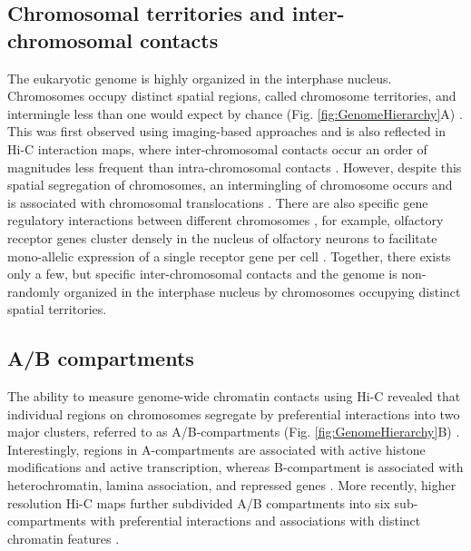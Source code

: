 \documentclass[a4paper,twoside=true,openright,parskip=full,chapterprefix=true,11pt,headings=normal,bibliography=totoc,listof=totoc,titlepage=on,captions=tableabove,draft=false]{scrreprt}
\theoremstyle{definition}
\theoremstyle{definition}
\theoremstyle{definition}
\theoremstyle{remark}
\begin{document}
\hypertarget{chromosomal-territories-and-inter-chromosomal-contacts}{%
\subsection{Chromosomal territories and inter-chromosomal
contacts}\label{chromosomal-territories-and-inter-chromosomal-contacts}}

The eukaryotic genome is highly organized in the interphase nucleus.
Chromosomes occupy distinct spatial regions, called chromosome
territories, and intermingle less than one would expect by chance (Fig.
\ref{fig:GenomeHierarchy}A) \citep{Cremer2001}. This was first observed
using imaging-based approaches and is also reflected in Hi-C interaction
maps, where inter-chromosomal contacts occur an order of magnitudes less
frequent than intra-chromosomal contacts \citep{Lieberman-Aiden2009}.
However, despite this spatial segregation of chromosomes, an
intermingling of chromosome occurs and is associated with chromosomal
translocations \citep{Branco2006, Roukos2013, Roukos2014}. There are
also specific gene regulatory interactions between different chromosomes
\citep{DeLaat2007}, for example, olfactory receptor genes cluster
densely in the nucleus of olfactory neurons to facilitate mono-allelic
expression of a single receptor gene per cell \citep{Monahan2015}.
Together, there exists only a few, but specific inter-chromosomal
contacts and the genome is non-randomly organized in the interphase
nucleus by chromosomes occupying distinct spatial territories.

\hypertarget{ab-compartments}{%
\subsection{A/B compartments}\label{ab-compartments}}

The ability to measure genome-wide chromatin contacts using Hi-C
revealed that individual regions on chromosomes segregate by
preferential interactions into two major clusters, referred to as
A/B-compartments (Fig. \ref{fig:GenomeHierarchy}B)
\citep{Lieberman-Aiden2009}. Interestingly, regions in A-compartments
are associated with active histone modifications and active
transcription, whereas B-compartment is associated with heterochromatin,
lamina association, and repressed genes \citep{Bonev2016}. More
recently, higher resolution Hi-C maps further subdivided A/B
compartments into six sub-compartments with preferential interactions
and associations with distinct chromatin features \citep{Rao2014}.
\end{document}

